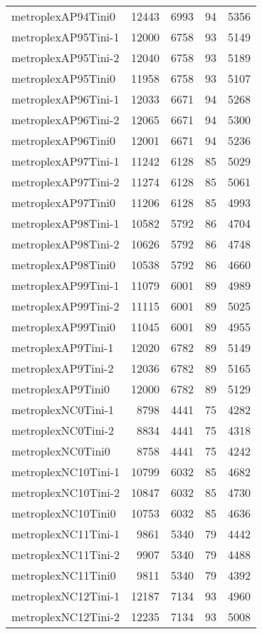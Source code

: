 \documentclass[../../../thesis.tex]{subfiles}
\begin{document}
\begin{longtable}{lrrrr}
metroplexAP94Tini0 & 12443 & 6993 & 94 & 5356 \\
metroplexAP95Tini-1 & 12000 & 6758 & 93 & 5149 \\
metroplexAP95Tini-2 & 12040 & 6758 & 93 & 5189 \\
metroplexAP95Tini0 & 11958 & 6758 & 93 & 5107 \\
metroplexAP96Tini-1 & 12033 & 6671 & 94 & 5268 \\
metroplexAP96Tini-2 & 12065 & 6671 & 94 & 5300 \\
metroplexAP96Tini0 & 12001 & 6671 & 94 & 5236 \\
metroplexAP97Tini-1 & 11242 & 6128 & 85 & 5029 \\
metroplexAP97Tini-2 & 11274 & 6128 & 85 & 5061 \\
metroplexAP97Tini0 & 11206 & 6128 & 85 & 4993 \\
metroplexAP98Tini-1 & 10582 & 5792 & 86 & 4704 \\
metroplexAP98Tini-2 & 10626 & 5792 & 86 & 4748 \\
metroplexAP98Tini0 & 10538 & 5792 & 86 & 4660 \\
metroplexAP99Tini-1 & 11079 & 6001 & 89 & 4989 \\
metroplexAP99Tini-2 & 11115 & 6001 & 89 & 5025 \\
metroplexAP99Tini0 & 11045 & 6001 & 89 & 4955 \\
metroplexAP9Tini-1 & 12020 & 6782 & 89 & 5149 \\
metroplexAP9Tini-2 & 12036 & 6782 & 89 & 5165 \\
metroplexAP9Tini0 & 12000 & 6782 & 89 & 5129 \\
metroplexNC0Tini-1 & 8798 & 4441 & 75 & 4282 \\
metroplexNC0Tini-2 & 8834 & 4441 & 75 & 4318 \\
metroplexNC0Tini0 & 8758 & 4441 & 75 & 4242 \\
metroplexNC10Tini-1 & 10799 & 6032 & 85 & 4682 \\
metroplexNC10Tini-2 & 10847 & 6032 & 85 & 4730 \\
metroplexNC10Tini0 & 10753 & 6032 & 85 & 4636 \\
metroplexNC11Tini-1 & 9861 & 5340 & 79 & 4442 \\
metroplexNC11Tini-2 & 9907 & 5340 & 79 & 4488 \\
metroplexNC11Tini0 & 9811 & 5340 & 79 & 4392 \\
metroplexNC12Tini-1 & 12187 & 7134 & 93 & 4960 \\
metroplexNC12Tini-2 & 12235 & 7134 & 93 & 5008 \\

\end{longtable}
\end{document}
